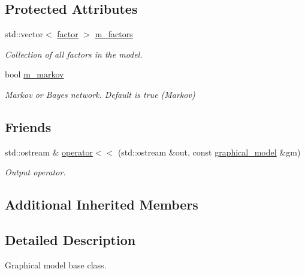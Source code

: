 \subsection*{Protected Attributes}
\begin{DoxyCompactItemize}
\item 
std\+::vector$<$ \hyperlink{classmerlin_1_1factor}{factor} $>$ \hyperlink{classmerlin_1_1graphical__model_aecae0801175e5752efc53146f9c7030e}{m\+\_\+factors}\hypertarget{classmerlin_1_1graphical__model_aecae0801175e5752efc53146f9c7030e}{}\label{classmerlin_1_1graphical__model_aecae0801175e5752efc53146f9c7030e}

\begin{DoxyCompactList}\small\item\em Collection of all factors in the model. \end{DoxyCompactList}\item 
bool \hyperlink{classmerlin_1_1graphical__model_a0f18dee551857422661f91927f9dda52}{m\+\_\+markov}\hypertarget{classmerlin_1_1graphical__model_a0f18dee551857422661f91927f9dda52}{}\label{classmerlin_1_1graphical__model_a0f18dee551857422661f91927f9dda52}

\begin{DoxyCompactList}\small\item\em Markov or Bayes network. Default is true (Markov) \end{DoxyCompactList}\end{DoxyCompactItemize}
\subsection*{Friends}
\begin{DoxyCompactItemize}
\item 
std\+::ostream \& \hyperlink{classmerlin_1_1graphical__model_ab797c308605a6f3098645515dfe2ddc0}{operator$<$$<$} (std\+::ostream \&out, const \hyperlink{classmerlin_1_1graphical__model}{graphical\+\_\+model} \&gm)
\begin{DoxyCompactList}\small\item\em Output operator. \end{DoxyCompactList}\end{DoxyCompactItemize}
\subsection*{Additional Inherited Members}


\subsection{Detailed Description}
Graphical model base class. 

